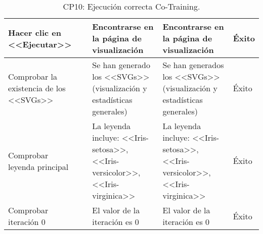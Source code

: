 \begin{table}[H]
\begin{tabular}{p{}p{}p{}p{}p{}}
Hacer clic en <<Ejecutar>>                            &                        & Encontrarse en la página de visualización                            & Encontrarse en la página de visualización                    & Éxito                            \\ \hline
Comprobar la existencia de los <<SVGs>>               &                        & Se han generado los <<SVGs>> (visualización y estadísticas generales) & Se han generados los <<SVGs>> (visualización y estadísticas generales)& Éxito  \\ \hline 
Comprobar leyenda principal                           &                        & La leyenda incluye: <<Iris-setosa>>, <<Iris-versicolor>>, <<Iris-virginica>> & La leyenda incluye: <<Iris-setosa>>, <<Iris-versicolor>>, <<Iris-virginica>> & Éxito \\ \hline
Comprobar iteración 0                                 &                        & El valor de la iteración es 0                                        & El valor de la iteración es 0                                & Éxito \\ \hline
\end{tabular}
\caption{CP10: Ejecución correcta Co-Training.}
\end{table}

